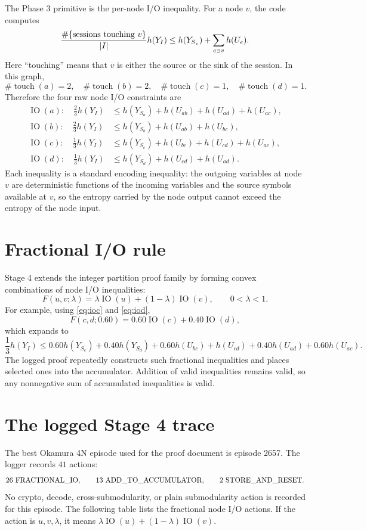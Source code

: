 \documentclass[11pt]{article}
\newcommand{\YI}{Y_I}
\newcommand{\YS}[1]{Y_{S_{#1}}}
\newcommand{\U}[2]{U_{#1#2}}
\newcommand{\IO}{\operatorname{IO}}
\begin{document}
The Phase 3 primitive is the per-node I/O inequality.  For a node \(v\), the
code computes
\[
\frac{\#\{\hbox{sessions touching }v\}}{|I|}h(\YI)
\leq
h(\YS{v})+\sum_{e\ni v}h(U_e).
\]
Here ``touching'' means that \(v\) is either the source or the sink of the
session.  In this graph,
\[
\#\operatorname{touch}(a)=2,\quad
\#\operatorname{touch}(b)=2,\quad
\#\operatorname{touch}(c)=1,\quad
\#\operatorname{touch}(d)=1.
\]
Therefore the four raw node I/O constraints are
\begin{align}
\IO(a):\quad
\frac23 h(\YI)
&\leq h(\YS{a})+h(\U{a}{b})+h(\U{a}{d})+h(\U{a}{c}), \label{eq:ioa}\\
\IO(b):\quad
\frac23 h(\YI)
&\leq h(\YS{b})+h(\U{a}{b})+h(\U{b}{c}), \label{eq:iob}\\
\IO(c):\quad
\frac13 h(\YI)
&\leq h(\YS{c})+h(\U{b}{c})+h(\U{c}{d})+h(\U{a}{c}), \label{eq:ioc}\\
\IO(d):\quad
\frac13 h(\YI)
&\leq h(\YS{d})+h(\U{c}{d})+h(\U{a}{d}). \label{eq:iod}
\end{align}
Each inequality is a standard encoding inequality: the outgoing variables at
node \(v\) are deterministic functions of the incoming variables and the source
symbols available at \(v\), so the entropy carried by the node output cannot
exceed the entropy of the node input.

\section{Fractional I/O rule}

Stage 4 extends the integer partition proof family by forming convex
combinations of node I/O inequalities:
\[
F(u,v;\lambda)=\lambda \IO(u)+(1-\lambda)\IO(v),
\qquad 0<\lambda<1.
\]
For example, using \eqref{eq:ioc} and \eqref{eq:iod},
\[
F(c,d;0.60)
=0.60\IO(c)+0.40\IO(d),
\]
which expands to
\[
\frac13h(\YI)
\leq
0.60h(\YS{c})+0.40h(\YS{d})
+0.60h(\U{b}{c})
+h(\U{c}{d})
+0.40h(\U{a}{d})
+0.60h(\U{a}{c}).
\]
The logged proof repeatedly constructs such fractional inequalities and places
selected ones into the accumulator.  Addition of valid inequalities remains
valid, so any nonnegative sum of accumulated inequalities is valid.

\section{The logged Stage 4 trace}

The best Okamura 4N episode used for the proof document is episode 2657.  The
logger records \(41\) actions:
\[
26\ \hbox{FRACTIONAL\_IO},\qquad
13\ \hbox{ADD\_TO\_ACCUMULATOR},\qquad
2\ \hbox{STORE\_AND\_RESET}.
\]
No crypto, decode, cross-submodularity, or plain submodularity action is
recorded for this episode.  The following table lists the fractional node I/O
actions.  If the action is \(u,v,\lambda\), it means
\(\lambda\IO(u)+(1-\lambda)\IO(v)\).
\end{document}
